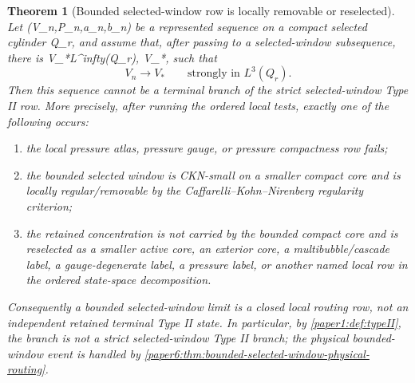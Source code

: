 \documentclass[11pt]{amsart}
\def\({}%
\def\){}%
\def\infty{infty}%
\theoremstyle{plain}
\newtheorem{theorem}{Theorem}[section]
\theoremstyle{definition}
\theoremstyle{remark}
\begin{document}
\begin{theorem}[Bounded selected-window row is locally removable or reselected]
\label{paper3:lem:scale-rigid-bounded-limit-exit}
Let \((V_n,P_n,a_n,b_n)\) be a represented sequence on a compact selected
cylinder \(Q_r\), and assume that, after passing to a selected-window
subsequence, there is \(V_*\in L^\infty(Q_r)\), \(V_*\not{}\), such that
\[
  V_n\to V_*
  \qquad\text{strongly in }L^3(Q_r).
\]
Then this sequence cannot be a terminal branch of the strict selected-window
Type II row.  More precisely, after running the ordered local tests, exactly
one of the following occurs:
\begin{enumerate}[label=\textup{(\roman*)}]
\item the local pressure atlas, pressure gauge, or pressure compactness row
      fails;
\item the bounded selected window is CKN-small on a smaller compact core and
      is locally regular/removable by the Caffarelli--Kohn--Nirenberg
      regularity criterion;
\item the retained concentration is not carried by the bounded compact core
      and is reselected as a smaller active core, an exterior core, a
      multibubble/cascade label, a gauge-degenerate label, a pressure label, or
      another named local row in the ordered state-space decomposition.
\end{enumerate}
Consequently a bounded selected-window limit is a closed local routing row, not
an independent retained terminal Type II state.  In particular, by
\cref{paper1:def:typeII}, the branch is not a strict selected-window Type II
branch; the physical bounded-window event is handled by
\cref{paper6:thm:bounded-selected-window-physical-routing}.
\end{theorem}
\end{document}
